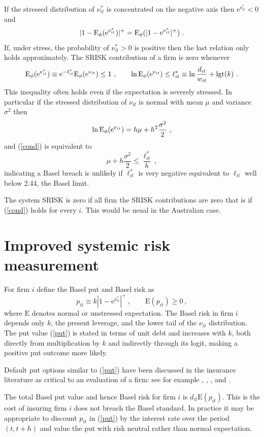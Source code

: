 \documentclass[authoryear]{elsarticle}
\newcommand{\logit}{\mathrm{lgt}}
\newcommand{\E}{\mathrm{E}}
\newcommand{\e}{\mathrm{e}}
\newcommand{\eref}[1]{(\ref{#1})}
\newcommand{\cq}{\ , \qquad}
\newcommand{\be}[1]{\begin{equation}\label{#1}}
\newcommand{\ee}{\end{equation}}
\begin{document}
 If the stressed distribution of $\nu^*_{it} $ is concentrated on the negative axis then  $\e^{\nu^*_{it}}<0$ and
$$
|1-\Es(\e^{\nu^*_{it}})|^+ =\Es(|1-\e^{\nu^*_{it}}|^+)\ .
$$
If, under stress, the probability of $\nu^*_{it}>0$ is positive  then the last relation only holds approximately.   The SRISK contribution of a firm is zero whenever
\be{cond}
\Es(\e^{\nu^*_{it}})\equiv \e^{-\ell_{it}^*}\Es(\e^{\nu_{it}})\le 1\cq \ln \Es(\e^{\nu_{it}})\le\ell^*_{it}\equiv\ln\frac{d_{it}}{w_{it}}+\logit(k)\ .
\ee
This inequality often holds even if the expectation is severely stressed.  In particular if the stressed distribution of $\nu_{it}$ is normal with mean $\mu$ and variance $\sigma^2$ then
$$
\ln \Es(\e^{\nu_{it}}) = h\mu +h^2\frac{\sigma^2}{2}\ ,
$$
and  \eref{cond} is equivalent to
$$
\mu +h\frac{\sigma^2}{2}\le \frac{\ell_{it}^*}{h} \ ,
$$
indicating a Basel breach is unlikely if $\ell^*_{it}$ is very negative equivalent to  $\ell_{it}$ well below 2.44, the Basel limit.


The system SRISK is zero if all firm the SRISK contributions are zero that is if \eref{cond} holds for every $i$.  This would be usual in the Australian case.



\section{Improved systemic risk measurement}

For  firm $i$ define the  Basel put and  Basel risk as 
\be{put}
p_{it}\equiv k |1-\e^{\nu^*_{it}}|^+\cq \E(p_{it})\ge 0\ ,
\ee
where $\E$ denotes normal or unstressed expectation.  The Basel risk in firm $i$ depends only $k$,  the present leverage,  and the lower tail of the  $\nu_{it}$ distribution.  The put value \eref{put} is stated in terms of unit debt and increases with $k$, both directly from  multiplication by $k$ and indirectly through its logit, making a positive put outcome more likely.  

Default put options similar to \eref{put} have been discussed in the insurance literature as critical to an evaluation of a firm:  see for
example \citet{merton1977analytic}, \citet{doherty1986price}, \citet{cummins1988risk}, \citet{myers2001capital} and \citet{sherris2006solvency}.

The total Basel put value and hence Basel risk for firm  $i$ is   $d_{it}\E(p_{it})$.   This is the cost of insuring firm $i$ does not breach the Basel standard.  In practice it may be appropriate to discount $p_{it}$ in \eref{put} by the interest rate over the period $(t,t+h)$ and value the put with risk neutral rather than normal expectation.       
\end{document}

